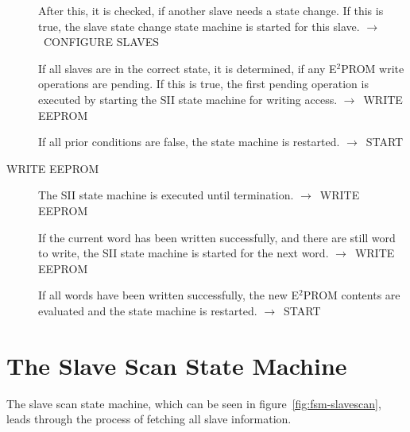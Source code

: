 \documentclass[a4paper,12pt,BCOR6mm,bibtotoc,idxtotoc]{scrbook}
\begin{document}
\begin{description}
  After this, it is checked, if another slave needs a state change. If
  this is true, the slave state change state machine is started for
  this slave. $\rightarrow$~CONFIGURE SLAVES

  If all slaves are in the correct state, it is determined, if any
  E$^2$PROM write operations are pending. If this is true, the first
  pending operation is executed by starting the SII state machine for
  writing access. $\rightarrow$~WRITE EEPROM

  If all prior conditions are false, the state machine is restarted.
  $\rightarrow$~START

\item[WRITE EEPROM] The SII state machine is executed until
  termination. $\rightarrow$~WRITE EEPROM

  If the current word has been written successfully, and there are
  still word to write, the SII state machine is started for the next
  word. $\rightarrow$~WRITE EEPROM

  If all words have been written successfully, the new E$^2$PROM
  contents are evaluated and the state machine is restarted.
  $\rightarrow$~START

\end{description}


\section{The Slave Scan State Machine}
\label{sec:fsm-scan}

The slave scan state machine, which can be seen in
figure~\ref{fig:fsm-slavescan}, leads through the process of fetching
all slave information.
\end{document}
